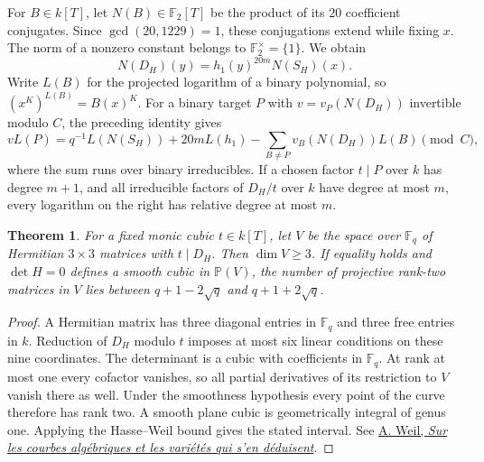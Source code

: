 \documentclass[11pt]{article}
\newtheorem{theorem}{Theorem}
\newcommand{\F}{\mathbb F_2}
\begin{document}
For \(B\in k[T]\), let \(N(B)\in\F[T]\) be the product of its
20 coefficient conjugates. Since \(\gcd(20,1229)=1\), these
conjugations extend while fixing \(x\). The norm of a nonzero
constant belongs to \(\F^\times=\{1\}\). We obtain
\[
 N(D_H)(y)=h_1(y)^{20m}N(S_H)(x).
\]
Write \(L(B)\) for the projected logarithm of a binary polynomial,
so \((x^K)^{L(B)}=B(x)^K\). For a binary target \(P\) with
\(v=v_P(N(D_H))\) invertible modulo \(C\), the preceding identity gives
\[
 vL(P)=q^{-1}L(N(S_H))+20mL(h_1)
       -\sum_{B\ne P}v_B(N(D_H))L(B)\pmod C ,
\]
where the sum runs over binary irreducibles. If a chosen factor
\(t\mid P\) over \(k\) has degree \(m+1\), and all irreducible
factors of \(D_H/t\) over \(k\) have degree at most \(m\), every
logarithm on the right has relative degree at most \(m\).

\begin{theorem}\label{thm:hermitian-plane}
For a fixed monic cubic \(t\in k[T]\), let \(V\) be the space over
\(\mathbb F_q\) of Hermitian \(3\times3\) matrices with \(t\mid D_H\).
Then \(\dim V\ge3\). If equality holds and \(\det H=0\) defines a
smooth cubic in \(\mathbb P(V)\), the number of projective rank-two
matrices in \(V\) lies between \(q+1-2\sqrt q\) and \(q+1+2\sqrt q\).
\end{theorem}
\begin{proof}
A Hermitian matrix has three diagonal entries in \(\mathbb F_q\)
and three free entries in \(k\). Reduction of \(D_H\) modulo \(t\)
imposes at most six linear conditions on these nine coordinates.
The determinant is a cubic with coefficients in \(\mathbb F_q\).
At rank at most one every cofactor vanishes, so all partial derivatives
of its restriction to \(V\) vanish there as well. Under the smoothness
hypothesis every point of the curve therefore has rank two. A smooth
plane cubic is geometrically integral of genus one. Applying the
Hasse--Weil bound gives the stated interval. See
\href{https://denisevellachemla.eu/Weil-courbes-varietes.pdf}{A. Weil,
\emph{Sur les courbes algébriques et les variétés qui s'en déduisent}}.
\end{proof}
\end{document}
